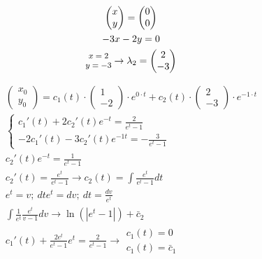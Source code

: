 \documentclass{article}
\begin{document}
\begin{fleqn}[1\parindent]
\begin{gather*}
    \begin{pmatrix}
      x \\ y
    \end{pmatrix}
    =
    \begin{pmatrix}
      0 \\ 0
    \end{pmatrix} \\ 
    -3x-2y=0 \\ 
    \begin{mmatrix}
      x = 2 \\ 
      y = -3 
    \end{mmatrix} \rightarrow \lambda_2 = 
    \begin{pmatrix}
      2 \\ -3
    \end{pmatrix} \\ 
  \end{gather*}
\end{fleqn}

\addtolength{\jot}{1pt}
\begin{fleqn}[1\parindent]
  \begin{gather*}
    \begin{pmatrix}
      x_0 \\ y_0
    \end{pmatrix} = 
    c_1(t) \cdot \begin{pmatrix}
      1 \\ -2
    \end{pmatrix}
    \cdot e^{0\cdot t} + c_2(t) \cdot \begin{pmatrix}
      2 \\ -3
    \end{pmatrix}
    \cdot e^{-1\cdot t} \\
    \begin{cases}
      c_1'(t)+2c_2'(t)e^{-t}=\frac{2}{e^t-1} \\
      -2c_1'(t)-3c_2'(t)e^{-1t}=-\frac{3}{e^t-1}
    \end{cases} \\ 
    c_2'(t)e^{-t}=\frac{1}{e^t-1}\\
    c_2'(t)=\frac{e^t}{e^t-1} \rightarrow
    c_2(t)=\int{\frac{e^t}{e^t-1}dt} \\ 
    e^t = v;\ dte^t = dv;\ dt = \frac{dv}{e^t} \\ 
    \int{\frac{1}{e^t}\frac{e^t}{v-1}dv} \rightarrow
    \ln{(|e^t-1|)}+\bar c_2 \\ 
    c_1'(t)+\frac{2e^t}{e^t-1}e^t=\frac{2}{e^t-1}\rightarrow
    \begin{matrix}
      c_1(t) = 0 \\ c_1(t) = \bar c_1
    \end{matrix}
  \end{gather*}
\end{fleqn}
\end{document}
